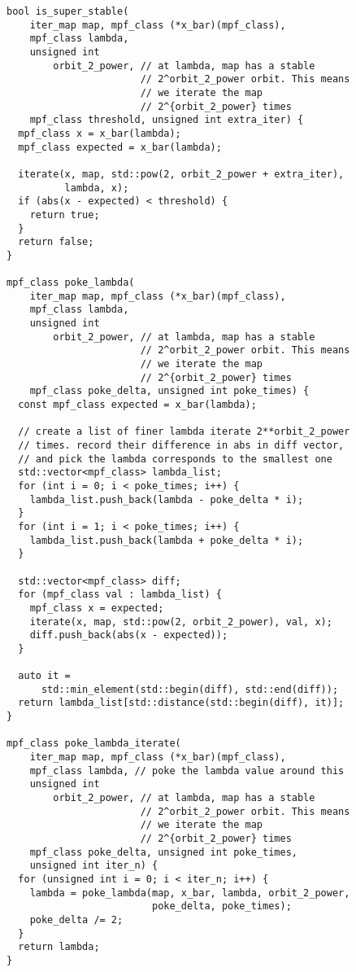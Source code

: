 \begin{lstlisting}[style=cppstyle]
bool is_super_stable(
    iter_map map, mpf_class (*x_bar)(mpf_class),
    mpf_class lambda,
    unsigned int
        orbit_2_power, // at lambda, map has a stable
                       // 2^orbit_2_power orbit. This means
                       // we iterate the map
                       // 2^{orbit_2_power} times
    mpf_class threshold, unsigned int extra_iter) {
  mpf_class x = x_bar(lambda);
  mpf_class expected = x_bar(lambda);

  iterate(x, map, std::pow(2, orbit_2_power + extra_iter),
          lambda, x);
  if (abs(x - expected) < threshold) {
    return true;
  }
  return false;
}

mpf_class poke_lambda(
    iter_map map, mpf_class (*x_bar)(mpf_class),
    mpf_class lambda,
    unsigned int
        orbit_2_power, // at lambda, map has a stable
                       // 2^orbit_2_power orbit. This means
                       // we iterate the map
                       // 2^{orbit_2_power} times
    mpf_class poke_delta, unsigned int poke_times) {
  const mpf_class expected = x_bar(lambda);

  // create a list of finer lambda iterate 2**orbit_2_power
  // times. record their difference in abs in diff vector,
  // and pick the lambda corresponds to the smallest one
  std::vector<mpf_class> lambda_list;
  for (int i = 0; i < poke_times; i++) {
    lambda_list.push_back(lambda - poke_delta * i);
  }
  for (int i = 1; i < poke_times; i++) {
    lambda_list.push_back(lambda + poke_delta * i);
  }

  std::vector<mpf_class> diff;
  for (mpf_class val : lambda_list) {
    mpf_class x = expected;
    iterate(x, map, std::pow(2, orbit_2_power), val, x);
    diff.push_back(abs(x - expected));
  }

  auto it =
      std::min_element(std::begin(diff), std::end(diff));
  return lambda_list[std::distance(std::begin(diff), it)];
}

mpf_class poke_lambda_iterate(
    iter_map map, mpf_class (*x_bar)(mpf_class),
    mpf_class lambda, // poke the lambda value around this
    unsigned int
        orbit_2_power, // at lambda, map has a stable
                       // 2^orbit_2_power orbit. This means
                       // we iterate the map
                       // 2^{orbit_2_power} times
    mpf_class poke_delta, unsigned int poke_times,
    unsigned int iter_n) {
  for (unsigned int i = 0; i < iter_n; i++) {
    lambda = poke_lambda(map, x_bar, lambda, orbit_2_power,
                         poke_delta, poke_times);
    poke_delta /= 2;
  }
  return lambda;
}


\end{lstlisting}
